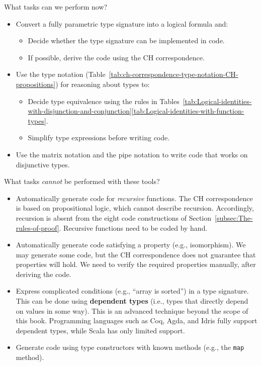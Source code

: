 What tasks can we perform now?
\begin{itemize}
\item Convert a fully parametric type signature into a logical formula and:
\begin{itemize}
\item Decide whether the type signature can be implemented in code.
\item If possible, derive the code using the CH correspondence.
\end{itemize}
\item Use the type notation (Table~\ref{tab:ch-correspondence-type-notation-CH-propositions})
for reasoning about types to:
\begin{itemize}
\item Decide type equivalence using the rules in Tables~\ref{tab:Logical-identities-with-disjunction-and-conjunction}\textendash \ref{tab:Logical-identities-with-function-types}.
\item Simplify type expressions before writing code.
\end{itemize}
\item Use the matrix notation and the pipe notation to write code that works
on disjunctive types.
\end{itemize}
What tasks \emph{cannot} be performed with these tools?
\begin{itemize}
\item Automatically generate code for \emph{recursive} functions. The CH
correspondence is based on propositional logic, which cannot describe
recursion. Accordingly, recursion is absent from the eight code constructions
of Section~\ref{subsec:The-rules-of-proof}. Recursive functions
need to be coded by hand.
\item Automatically generate code satisfying a property (e.g., isomorphism).
We may generate some code, but the CH correspondence does not guarantee
that properties will hold. We need to verify the required properties
manually, after deriving the code.
\item Express complicated conditions (e.g., \textsf{``}array is sorted\textsf{''}) in a
type signature. This can be done using \textbf{dependent types}
(i.e., types that directly depend on values in some way). This is
an advanced technique beyond the scope of this book. Programming languages
such as Coq, Agda, and Idris fully support dependent types, while
Scala has only limited support.
\item Generate code using type constructors with known methods (e.g., the
\lstinline!map! method).
\end{itemize}
